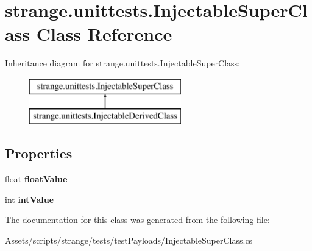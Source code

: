 \hypertarget{classstrange_1_1unittests_1_1_injectable_super_class}{\section{strange.\-unittests.\-Injectable\-Super\-Class Class Reference}
\label{classstrange_1_1unittests_1_1_injectable_super_class}
}
Inheritance diagram for strange.\-unittests.\-Injectable\-Super\-Class\-:\begin{figure}[H]
\begin{center}
\leavevmode
\includegraphics[height=2.000000cm]{classstrange_1_1unittests_1_1_injectable_super_class}
\end{center}
\end{figure}
\subsection*{Properties}
\begin{DoxyCompactItemize}
\item 
\hypertarget{classstrange_1_1unittests_1_1_injectable_super_class_ac4985b47d7aa8fb1f6fa42a34aed4242}{float {\bfseries float\-Value}}\label{classstrange_1_1unittests_1_1_injectable_super_class_ac4985b47d7aa8fb1f6fa42a34aed4242}

\item 
\hypertarget{classstrange_1_1unittests_1_1_injectable_super_class_ae36dc0c77a190a9b20fb328ed2afa480}{int {\bfseries int\-Value}}\label{classstrange_1_1unittests_1_1_injectable_super_class_ae36dc0c77a190a9b20fb328ed2afa480}

\end{DoxyCompactItemize}


The documentation for this class was generated from the following file\-:\begin{DoxyCompactItemize}
\item 
Assets/scripts/strange/tests/test\-Payloads/Injectable\-Super\-Class.\-cs\end{DoxyCompactItemize}
